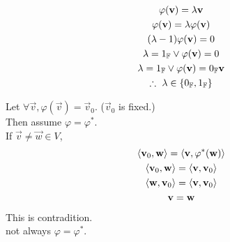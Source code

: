 \documentclass[1]{mathtoolkit}
\begin{document}
\begin{p}
  \item
    \begin{subp}
      \item
        \begin{gather}
          \varphi(\vec{v}) = \lambda \vec{v} \\
          \varphi(\vec{v}) = \lambda \varphi(\vec{v}) \\
          (\lambda - 1) \varphi(\vec{v}) = 0 \\
          \lambda = 1_\field{F} \vee \varphi(\vec{v}) = 0 \\
          \lambda = 1_\field{F} \vee \varphi(\vec{v}) = 0_\field{F} \vec{v} \\
          \therefore \lambda \in \left\{ 0_\field{F}, 1_\field{F} \right\}
        \end{gather}

      \item
        Let $\forall \vec{v}, \varphi(\vec{v}) = \vec{v}_0$.
        ($\vec{v}_0$ is fixed.) \\
        Then assume $\varphi = \varphi^*$. \\
        If $\vec{v} \ne \vec{w} \in V$,
        \begin{gather}
          \langle \mathbf{v}_0, \mathbf{w} \rangle = \langle \mathbf{v}, \varphi^*(\mathbf{w}) \rangle \\
          \langle \mathbf{v}_0, \mathbf{w} \rangle = \langle \mathbf{v}, \mathbf{v}_0 \rangle \\
          \langle \mathbf{w}, \mathbf{v}_0 \rangle = \langle \mathbf{v}, \mathbf{v}_0 \rangle \\
          \mathbf{v} = \mathbf{w}
        \end{gather}
        This is contradition. \\
        \therefore not always $\varphi = \varphi^*$.
    \end{subp}


\end{p}
\end{document}
